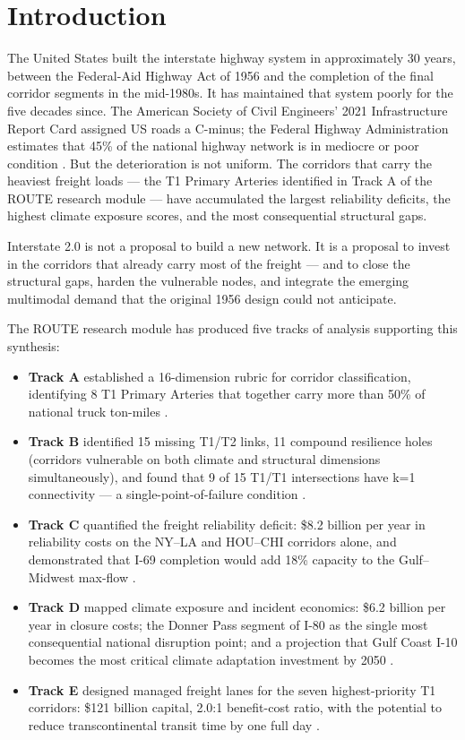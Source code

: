 \section{Introduction}

The United States built the interstate highway system in approximately 30 years, between the Federal-Aid Highway Act of 1956 and the completion of the final corridor segments in the mid-1980s. It has maintained that system poorly for the five decades since. The American Society of Civil Engineers' 2021 Infrastructure Report Card assigned US roads a C-minus; the Federal Highway Administration estimates that 45\% of the national highway network is in mediocre or poor condition \citep{FHWA_HPMS2022}. But the deterioration is not uniform. The corridors that carry the heaviest freight loads --- the T1 Primary Arteries identified in Track A of the ROUTE research module \citep{ROUTE_A1} --- have accumulated the largest reliability deficits, the highest climate exposure scores, and the most consequential structural gaps.

Interstate 2.0 is not a proposal to build a new network. It is a proposal to invest in the corridors that already carry most of the freight --- and to close the structural gaps, harden the vulnerable nodes, and integrate the emerging multimodal demand that the original 1956 design could not anticipate.

The ROUTE research module has produced five tracks of analysis supporting this synthesis:
\begin{itemize}
  \item \textbf{Track A} established a 16-dimension rubric for corridor classification, identifying 8 T1 Primary Arteries that together carry more than 50\% of national truck ton-miles \citep{ROUTE_A1,ROUTE_A2}.
  \item \textbf{Track B} identified 15 missing T1/T2 links, 11 compound resilience holes (corridors vulnerable on both climate and structural dimensions simultaneously), and found that 9 of 15 T1/T1 intersections have k=1 connectivity --- a single-point-of-failure condition \citep{ROUTE_B1,ROUTE_B3,ROUTE_B4}.
  \item \textbf{Track C} quantified the freight reliability deficit: \$8.2 billion per year in reliability costs on the NY--LA and HOU--CHI corridors alone, and demonstrated that I-69 completion would add 18\% capacity to the Gulf--Midwest max-flow \citep{ROUTE_C1,ROUTE_C2}.
  \item \textbf{Track D} mapped climate exposure and incident economics: \$6.2 billion per year in closure costs; the Donner Pass segment of I-80 as the single most consequential national disruption point; and a projection that Gulf Coast I-10 becomes the most critical climate adaptation investment by 2050 \citep{ROUTE_D1,ROUTE_D2}.
  \item \textbf{Track E} designed managed freight lanes for the seven highest-priority T1 corridors: \$121 billion capital, 2.0:1 benefit-cost ratio, with the potential to reduce transcontinental transit time by one full day \citep{ROUTE_E1}.
\end{itemize}

